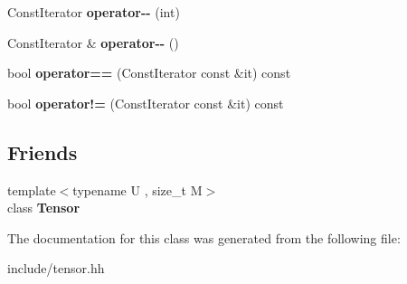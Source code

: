 \begin{DoxyCompactItemize}
\item 
Const\+Iterator {\bfseries operator-\/-\/} (int)\hypertarget{classtensor_1_1Tensor_3_01T_00_010_01_4_1_1ConstIterator_a2e2984237dd99248395bff889082f904}{}\label{classtensor_1_1Tensor_3_01T_00_010_01_4_1_1ConstIterator_a2e2984237dd99248395bff889082f904}

\item 
Const\+Iterator \& {\bfseries operator-\/-\/} ()\hypertarget{classtensor_1_1Tensor_3_01T_00_010_01_4_1_1ConstIterator_afae1f2980696095dc53e6936c2e64787}{}\label{classtensor_1_1Tensor_3_01T_00_010_01_4_1_1ConstIterator_afae1f2980696095dc53e6936c2e64787}

\item 
bool {\bfseries operator==} (Const\+Iterator const \&it) const \hypertarget{classtensor_1_1Tensor_3_01T_00_010_01_4_1_1ConstIterator_ab5bf9978d77c6969f6ebde63e702fda8}{}\label{classtensor_1_1Tensor_3_01T_00_010_01_4_1_1ConstIterator_ab5bf9978d77c6969f6ebde63e702fda8}

\item 
bool {\bfseries operator!=} (Const\+Iterator const \&it) const \hypertarget{classtensor_1_1Tensor_3_01T_00_010_01_4_1_1ConstIterator_a1738114a92b9c33dcff234eeadc2d94b}{}\label{classtensor_1_1Tensor_3_01T_00_010_01_4_1_1ConstIterator_a1738114a92b9c33dcff234eeadc2d94b}

\end{DoxyCompactItemize}
\subsection*{Friends}
\begin{DoxyCompactItemize}
\item 
{\footnotesize template$<$typename U , size\+\_\+t M$>$ }\\class {\bfseries Tensor}\hypertarget{classtensor_1_1Tensor_3_01T_00_010_01_4_1_1ConstIterator_af4a07134de1525172d3c60c57e8f1496}{}\label{classtensor_1_1Tensor_3_01T_00_010_01_4_1_1ConstIterator_af4a07134de1525172d3c60c57e8f1496}

\end{DoxyCompactItemize}


The documentation for this class was generated from the following file\+:\begin{DoxyCompactItemize}
\item 
include/tensor.\+hh\end{DoxyCompactItemize}
